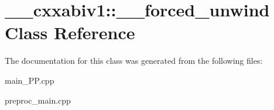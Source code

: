 \hypertarget{class____cxxabiv1_1_1____forced__unwind}{\section{\+\_\+\+\_\+cxxabiv1\+:\+:\+\_\+\+\_\+forced\+\_\+unwind Class Reference}
\label{class____cxxabiv1_1_1____forced__unwind}
}


The documentation for this class was generated from the following files\+:\begin{DoxyCompactItemize}
\item 
main\+\_\+\+P\+P.\+cpp\item 
preproc\+\_\+main.\+cpp\end{DoxyCompactItemize}
